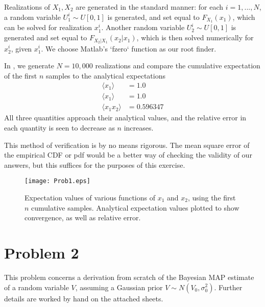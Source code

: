 \documentclass[11pt]{article}
\begin{document}
Realizations of $X_1,X_2$ are generated in the standard manner: for each $i = 1, ..., N$, a random variable $U_1^i \sim U[0,1]$ is generated, and set equal to $F_{X_1}(x_1)$, which can be solved for realization $x_1^i$. Another random variable $U_2^i \sim U[0,1]$ is generated and set equal to $F_{X_2|X_1}(x_2|x_1)$, which is then solved numerically for $x_2^i$, given $x_1^i$. We choose Matlab's `fzero` function as our root finder.

In , we generate $N=10,\!000$ realizations and compare the cumulative expectation of the first $n$ samples to the analytical expectations
\begin{equation}
\begin{aligned}
\langle x_1 \rangle &= 1.0 \\
\langle x_1 \rangle &= 1.0 \\
\langle x_1 x_2 \rangle &= 0.596347
\end{aligned}
\end{equation}
All three quantities approach their analytical values, and the relative error in each quantity is seen to decrease as $n$ increases.

This method of verification is by no means rigorous. The mean square error of the empirical CDF or pdf would be a better way of checking the validity of our answers, but this suffices for the purposes of this exercise.

\begin{figure}[t]
\centering
\texttt{[image: Prob1.eps]}
\caption{Expectation values of various functions of $x_1$ and $x_2$, using the first $n$ cumulative samples. Analytical expectation values plotted to show convergence, as well as relative error.}
\label{fig:prob1}
\end{figure}

\section*{Problem 2} %

This problem concerns a derivation from scratch of the Bayesian MAP estimate of a random variable $V$, assuming a Gaussian prior $V \sim N(V_0, \sigma_0^2)$. Further details are worked by hand on the attached sheets.
\end{document}
